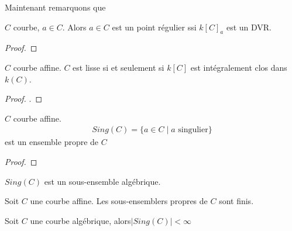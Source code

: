         Maintenant remarquons que
        \begin{theo}
            $C$ courbe, $a \in C$. Alors $a \in C$ est un point régulier ssi $k[C]_a$ est un DVR.
        \end{theo}
        \begin{proof}
        \end{proof}
        \begin{theo}
            $C$ courbe affine. $C$ est lisse si et seulement si $k[C]$ est intégralement clos dans $k(C)$.
        \end{theo}
        \begin{proof}
            .
        \end{proof}
        \begin{theo}
            $C$ courbe affine.
            \begin{align*}
                Sing(C) = \{a \in C \mid a \text{ singulier} \}
            \end{align*}
            est un ensemble propre de $C$
        \end{theo}
        \begin{proof}
        \end{proof}
        \begin{exo}
            $Sing(C)$ est un sous-ensemble algébrique. 
        \end{exo}
        \begin{prop}
            \label{prop412}
            Soit $C$ une courbe affine. Les sous-ensemblers propres de $C$ sont finis.
        \end{prop}
        \begin{coro}
            Soit $C$ une courbe algébrique, alors$|Sing(C)| < \infty$
        \end{coro}
